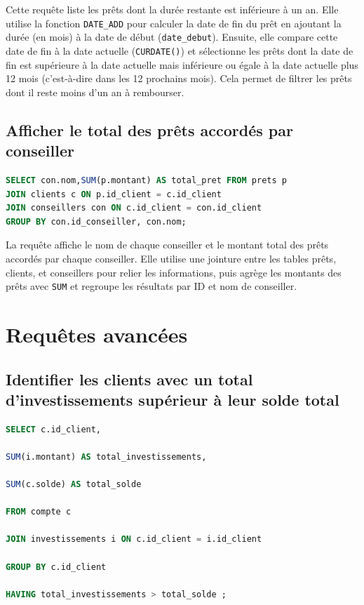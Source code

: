 \documentclass[12pt,a4paper]{article}
\begin{document}
\vspace{.5cm}

Cette requête liste les prêts dont la durée restante est inférieure à un an. Elle utilise la fonction      \texttt{DATE\_ADD} pour calculer la date de fin du prêt en ajoutant la durée (en mois) à la date de début (\texttt{date\_debut}). Ensuite, elle compare cette date de fin à la date actuelle (\texttt{CURDATE()}) et sélectionne les prêts dont la date de fin est supérieure à la date actuelle mais inférieure ou égale à la date actuelle plus 12 mois (c'est-à-dire dans les 12 prochains mois). Cela permet de filtrer les prêts dont il reste moins d'un an à rembourser. 

	\subsection{Afficher le total des prêts accordés par conseiller}
\begin{lstlisting}[language=SQL]
SELECT con.nom,SUM(p.montant) AS total_pret FROM prets p 
JOIN clients c ON p.id_client = c.id_client 
JOIN conseillers con ON c.id_client = con.id_client 
GROUP BY con.id_conseiller, con.nom; 
\end{lstlisting}

\vspace{.5cm}

La requête affiche le nom de chaque conseiller et le montant total des prêts accordés par chaque conseiller. Elle utilise une jointure entre les tables prêts, clients, et conseillers pour relier les informations, puis agrège les montants des prêts avec \texttt{SUM} et regroupe les résultats par ID et nom de conseiller.
	
\newpage

\section{Requêtes avancées}

	\subsection{Identifier les clients avec un total d'investissements supérieur à leur solde total}
\begin{lstlisting}[language=SQL]
SELECT c.id_client,  

SUM(i.montant) AS total_investissements,  

SUM(c.solde) AS total_solde  

FROM compte c  

JOIN investissements i ON c.id_client = i.id_client  

GROUP BY c.id_client  

HAVING total_investissements > total_solde ; 
\end{lstlisting}
\end{document}
